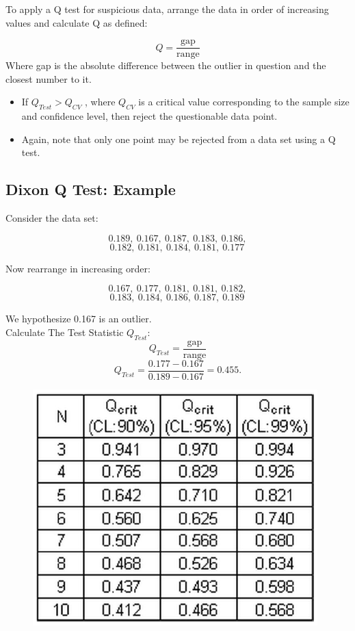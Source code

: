 \documentclass[a4paper,12pt]{article}
\begin{document}
To apply a Q test for suspicious data, arrange the data in order of increasing values and calculate Q as defined:

\[ Q = \frac{\text{gap}}{\text{range}} \]
Where gap is the absolute difference between the outlier in question and the closest number to it. 

\begin{itemize}
	\item 	If $Q_{Test} > Q_{CV}$ , where $Q_{CV}$ is a critical value corresponding to the sample size and confidence level, then reject the questionable data point. 
	\item Again, note that only one point may be rejected from a data set using a Q test.
\end{itemize}


\subsection{Dixon Q Test: Example}
Consider the data set:
\begin{framed}
	\[0.189,\ 0.167,\ 0.187,\ 0.183,\ 0.186,\]\[ 0.182,\ 0.181,\ 0.184,\ 0.181,\ 0.177 \,\]
\end{framed}
Now rearrange in increasing order:
\begin{framed}
	\[0.167,\ 0.177,\ 0.181,\ 0.181,\ 0.182,\]\[ 0.183,\ 0.184,\ 0.186,\ 0.187,\ 0.189 \, \]
\end{framed}

We hypothesize 0.167 is an outlier. \\ Calculate The Test Statistic $Q_{Test}$:
{
	\[ Q_{Test}=\frac{\text{gap}}{\text{range}}  \]
	\[ Q_{Test} 
	= \frac{0.177-0.167}{0.189-0.167}=0.455.\]
}

\begin{figure}
	\centering
	\includegraphics[width=0.5\linewidth]{images/DixonQTestTables}
	\caption{}
	\label{fig:dixonqtesttables}
\end{figure}
\end{document}
